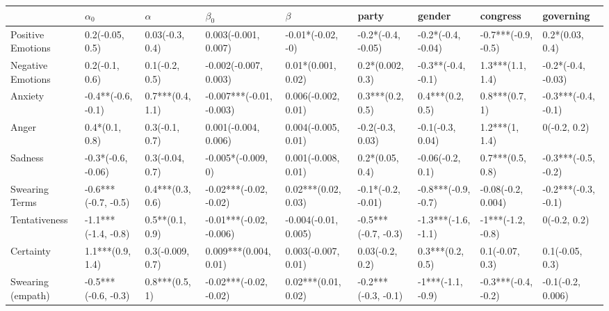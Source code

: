 \begin{table}[h]\centering
\begin{adjustbox}{width=\linewidth, center}
	\begin{tabular}{lllllllll}
	\toprule
	{} &           $\alpha_0$ &             $\alpha$ &                 $\beta_0$ &                 $\beta$ &                party &               gender &             congress &            governing \\
	\midrule
	Positive Emotions     &      0.2(-0.05, 0.5) &      0.03(-0.3, 0.4) &      0.003(-0.001, 0.007) &       -0.01*(-0.02, -0) &   -0.2*(-0.4, -0.05) &   -0.2*(-0.4, -0.04) &  -0.7***(-0.9, -0.5) &      0.2*(0.03, 0.4) \\
	Negative Emotions     &       0.2(-0.1, 0.6) &       0.1(-0.2, 0.5) &     -0.002(-0.007, 0.003) &      0.01*(0.001, 0.02) &     0.2*(0.002, 0.3) &   -0.3**(-0.4, -0.1) &     1.3***(1.1, 1.4) &   -0.2*(-0.4, -0.03) \\
	Anxiety               &   -0.4**(-0.6, -0.1) &     0.7***(0.4, 1.1) &  -0.007***(-0.01, -0.003) &     0.006(-0.002, 0.01) &     0.3***(0.2, 0.5) &     0.4***(0.2, 0.5) &       0.8***(0.7, 1) &  -0.3***(-0.4, -0.1) \\
	Anger                 &       0.4*(0.1, 0.8) &       0.3(-0.1, 0.7) &      0.001(-0.004, 0.006) &     0.004(-0.005, 0.01) &     -0.2(-0.3, 0.03) &     -0.1(-0.3, 0.04) &       1.2***(1, 1.4) &         0(-0.2, 0.2) \\
	Sadness               &   -0.3*(-0.6, -0.06) &      0.3(-0.04, 0.7) &        -0.005*(-0.009, 0) &     0.001(-0.008, 0.01) &      0.2*(0.05, 0.4) &     -0.06(-0.2, 0.1) &     0.7***(0.5, 0.8) &  -0.3***(-0.5, -0.2) \\
	Swearing Terms        &  -0.6***(-0.7, -0.5) &     0.4***(0.3, 0.6) &    -0.02***(-0.02, -0.02) &     0.02***(0.02, 0.03) &   -0.1*(-0.2, -0.01) &  -0.8***(-0.9, -0.7) &   -0.08(-0.2, 0.004) &  -0.2***(-0.3, -0.1) \\
	Tentativeness         &  -1.1***(-1.4, -0.8) &      0.5**(0.1, 0.9) &   -0.01***(-0.02, -0.006) &    -0.004(-0.01, 0.005) &  -0.5***(-0.7, -0.3) &  -1.3***(-1.6, -1.1) &    -1***(-1.2, -0.8) &         0(-0.2, 0.2) \\
	Certainty             &     1.1***(0.9, 1.4) &     0.3(-0.009, 0.7) &     0.009***(0.004, 0.01) &     0.003(-0.007, 0.01) &      0.03(-0.2, 0.2) &     0.3***(0.2, 0.5) &      0.1(-0.07, 0.3) &      0.1(-0.05, 0.3) \\
	Swearing (empath)     &  -0.5***(-0.6, -0.3) &       0.8***(0.5, 1) &    -0.02***(-0.02, -0.02) &     0.02***(0.01, 0.02) &  -0.2***(-0.3, -0.1) &    -1***(-1.1, -0.9) &  -0.3***(-0.4, -0.2) &    -0.1(-0.2, 0.006) \\

\end{tabular}
\end{adjustbox}
\end{table}
